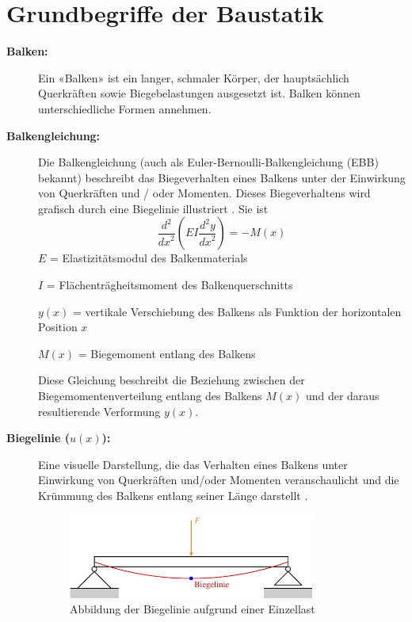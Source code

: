 %
%
%
%
\section{Grundbegriffe der Baustatik}
\label{balken:section:teil1}
\begin{description}
\item[\textbf{Balken:}] Ein «Balken» ist ein langer, schmaler Körper, der hauptsächlich Querkräften sowie Biegebelastungen ausgesetzt ist.
Balken können unterschiedliche Formen annehmen.

\item[\textbf{Balkengleichung:}] Die Balkengleichung (auch als Euler-Bernoulli-Balkengleichung (EBB) bekannt) beschreibt das Biegeverhalten eines Balkens unter der Einwirkung von Querkräften und / oder Momenten.
Dieses Biegeverhaltens wird grafisch durch eine Biegelinie illustriert \cite{balken:Biegelinie}. Sie ist
\begin{equation}
	\frac{d^2}{{dx}^2}\left(EI\frac{d^2y}{{dx}^2}\right)
	=-M(x)
\end{equation}
$E$ = Elastizitätsmodul des Balkenmaterials

$I$ = Flächenträgheitsmoment des Balkenquerschnitts

$y(x)$ = vertikale Verschiebung des Balkens als Funktion der horizontalen Position $x$

$M(x)$ = Biegemoment entlang des Balkens

Diese Gleichung beschreibt die Beziehung zwischen der Biegemomentenverteilung entlang des Balkens $M(x)$ und der daraus resultierende Verformung $y(x)$.

\item[\textbf{Biegelinie ($u(x)$):}] Eine visuelle Darstellung, die das Verhalten eines Balkens unter Einwirkung von Querkräften und/oder Momenten veranschaulicht und die Krümmung des Balkens entlang seiner Länge darstellt \cite{balken:Biegelinie}.
\begin{figure}
	\centering
	\includegraphics[width=0.8\textwidth]{papers/balken/images/teil1/Biegelinie1.pdf}
	\caption{Abbildung der Biegelinie aufgrund einer Einzellast}
	\label{fig:Abbildung der Biegelinie aufgrund einer Einzellast}
\end{figure}


\end{description}
